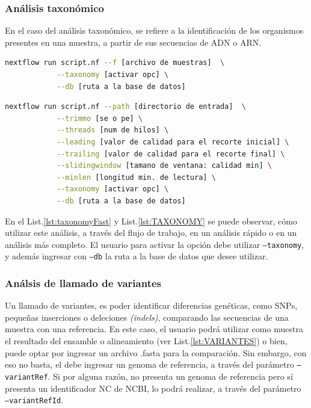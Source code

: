 \documentclass[12pt]{article}
\begin{document}
\subsubsection*{Análisis taxonómico}

En el caso del análisis taxonómico, se refiere a la 
identificación de los organismos presentes en una muestra, 
a partir de sus secuencias de ADN o ARN. 

\begin{center}
    \begin{lstlisting}[language=bash, caption=Comando para ejecutar un análisis rápido de identificación taxonómica \emph{(elaboración propia)}., label=lst:taxonomyFast]
        nextflow run script.nf --f [archivo de muestras]  \
            --taxonomy [activar opc] \
            --db [ruta a la base de datos]
    \end{lstlisting}
\end{center}


\begin{center}
    \begin{lstlisting}[language=bash, caption=Comando para la ejecución de un análisis de identificación taxonómica \emph{(elaboración propia)}., label=lst:TAXONOMY]
        nextflow run script.nf --path [directorio de entrada]  \
            --trimmo [se o pe] \
            --threads [num de hilos] \
            --leading [valor de calidad para el recorte inicial] \
            --trailing [valor de calidad para el recorte final] \
            --slidingwindow [tamano de ventana: calidad min] \
            --minlen [longitud min. de lectura] \
            --taxonomy [activar opc] \
            --db [ruta a la base de datos]
    \end{lstlisting}
\end{center}

En el List.\ref{lst:taxonomyFast} y List.\ref{lst:TAXONOMY} se puede 
observar, cómo utilizar este análisis, a través del flujo de 
trabajo, en un análisis rápido o en un análisis más completo. 
El usuario para activar la opción debe utilizar \texttt{--taxonomy}, y 
además ingresar con \texttt{--db} la ruta a la base de datos que desee  
utilizar.

\subsubsection*{Análsis de llamado de variantes}

Un llamado de variantes, es poder identificar diferencias genéticas, 
como SNPs, pequeñas inserciones o deleciones \emph{(indels)}, comparando 
las secuencias de una muestra con una referencia. En este caso, el 
usuario podrá utilizar como muestra el resultado del ensamble o 
alineamiento (ver List.\ref{lst:VARIANTES}) o bien, puede optar por  ingresar un 
archivo .fasta para la comparación. Sin embargo, con eso no basta, 
el debe ingresar un genoma de referencia, a través del parámetro 
\texttt{--variantRef}. Si por alguna razón, no presenta un genoma de 
referencia pero sí presenta un identificador NC de NCBI, lo 
podrá realizar, a través del parámetro \texttt{--variantRefId}.
\end{document}
